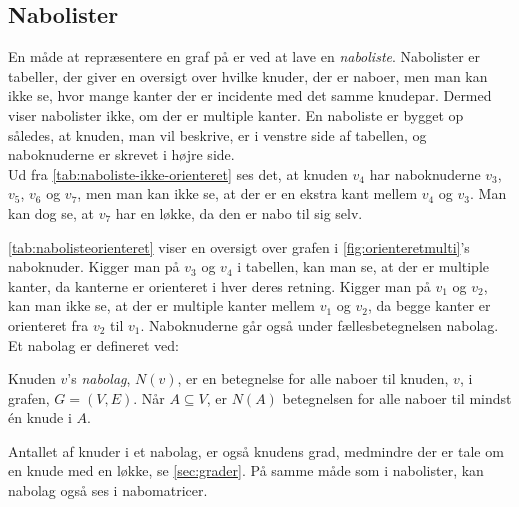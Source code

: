 \subsection{Nabolister}
En måde at repræsentere en graf på er ved at lave en \emph{naboliste}. Nabolister er tabeller, der giver en oversigt over hvilke knuder, der er naboer, men man kan ikke se, hvor mange kanter der er incidente med det samme knudepar. Dermed viser nabolister ikke, om der er multiple kanter. En naboliste er bygget op således, at knuden, man vil beskrive, er i venstre side af tabellen, og naboknuderne er skrevet i højre side. \\




Ud fra \autoref{tab:naboliste-ikke-orienteret} ses det, at knuden $v_4$ har naboknuderne $v_3$, $v_5$, $v_6$ og $v_7$, men man kan ikke se, at der er en ekstra kant mellem $v_4$ og $v_3$. Man kan dog se, at $v_7$ har en løkke, da den er nabo til sig selv.


\autoref{tab:nabolisteorienteret} viser en oversigt over grafen i \autoref{fig:orienteretmulti}'s naboknuder. Kigger man på $v_3$ og $v_4$ i tabellen, kan man se, at der er multiple kanter, da kanterne er orienteret i hver deres retning. Kigger man på $v_1$ og $v_2$, kan man ikke se, at der er multiple kanter mellem $v_1$ og $v_2$, da begge kanter er orienteret fra $v_2$ til $v_1$. Naboknuderne går også under fællesbetegnelsen nabolag. Et nabolag er defineret ved:

\begin{defn}[Nabolag] \label{defn:nabolag}
Knuden $v$'s \emph{nabolag}, $N(v)$, er en betegnelse for alle naboer til knuden, $v$, i grafen, $G=(V,E)$. Når $A \subseteq V$, er $N(A)$ betegnelsen for alle naboer til mindst én knude i $A$.
\end{defn}

Antallet af knuder i et nabolag, er også knudens grad, medmindre der er tale om en knude med en løkke, se \autoref{sec:grader}. 
På samme måde som i nabolister, kan nabolag også ses i nabomatricer.